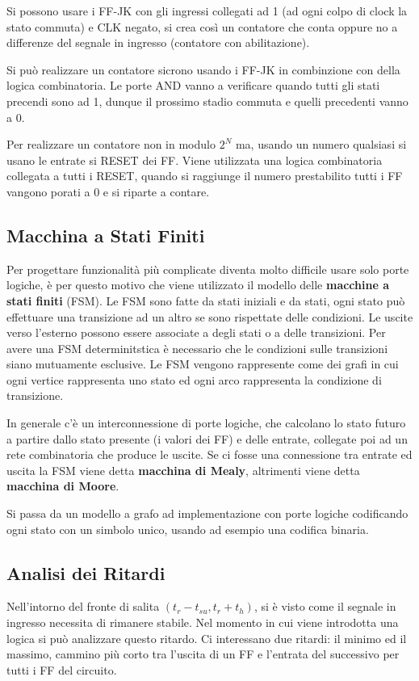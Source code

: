 \documentclass[12pt]{article}
\begin{document}
Si possono usare i FF-JK con gli ingressi collegati ad 1 (ad ogni colpo di clock la stato commuta) e CLK negato, si crea cos\`i un contatore che conta oppure no a differenze del segnale in ingresso (contatore con abilitazione).

Si pu\`o realizzare un contatore sicrono usando i FF-JK in combinzione con della logica combinatoria. Le porte AND vanno a verificare quando tutti gli stati precendi sono ad 1, dunque il prossimo stadio commuta e quelli precedenti vanno a 0.

Per realizzare un contatore non in modulo $2^N$ ma, usando un numero qualsiasi si usano le entrate si RESET dei FF. Viene utilizzata una logica combinatoria collegata a tutti i RESET, quando si raggiunge il numero prestabilito tutti i FF vangono porati a 0 e si riparte a contare.

\subsection{Macchina a Stati Finiti}
Per progettare funzionalit\`a pi\`u complicate diventa molto difficile usare solo porte logiche, \`e per questo motivo che viene utilizzato il modello delle \textbf{macchine a stati finiti} (FSM). Le FSM sono fatte da stati iniziali e da stati, ogni stato pu\`o effettuare una transizione ad un altro se sono rispettate delle condizioni. Le uscite verso l'esterno possono essere associate a degli stati o a delle transizioni. Per avere una FSM determinitstica \`e necessario che le condizioni sulle transizioni siano mutuamente esclusive. Le FSM vengono rappresente come dei grafi in cui ogni vertice rappresenta uno stato ed ogni arco rappresenta la condizione di transizione.

In generale c'\`e un interconnessione di porte logiche, che calcolano lo stato futuro a partire dallo stato presente (i valori dei FF) e delle entrate, collegate poi ad un rete combinatoria che produce le uscite. 
Se ci fosse una connessione tra entrate ed uscita la FSM viene detta \textbf{macchina di Mealy}, altrimenti viene detta \textbf{macchina di Moore}.

Si passa da un modello a grafo ad implementazione con porte logiche codificando ogni stato con un simbolo unico, usando ad esempio una codifica binaria. 

\subsection{Analisi dei Ritardi}
Nell'intorno del fronte di salita $(t_r - t_{su}, t_r + t_h)$, si \`e visto come il segnale in ingresso necessita di rimanere stabile. Nel momento in cui viene introdotta una logica si pu\`o analizzare questo ritardo. Ci interessano due ritardi: il minimo ed il massimo, cammino pi\`u corto tra l'uscita di un FF e l'entrata del successivo per tutti i FF del circuito. 
\end{document}
